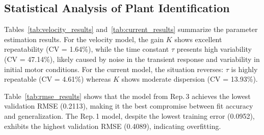 \documentclass[conference]{IEEEtran}
\begin{document}
\subsection{Statistical Analysis of Plant Identification}

Tables~\ref{tab:velocity_results} and~\ref{tab:current_results} summarize the
parameter estimation results. For the velocity model, the gain $K$ shows excellent
repeatability (CV = 1.64\%), while the time constant $\tau$ presents high variability
(CV = 47.14\%), likely caused by noise in the transient response and variability in
initial motor conditions. For the current model, the situation reverses: $\tau$ is
highly repeatable (CV = 4.61\%) whereas $K$ shows moderate dispersion (CV = 13.93\%).

\begin{table}[H]
\centering
\caption{Experimental results for velocity model identification.}
\label{tab:velocity_results}
\end{table}

\begin{table}[H]
\centering
\caption{Experimental results for current model identification.}
\label{tab:current_results}
\end{table}

Table~\ref{tab:rmse_results} shows that the model from Rep.\,3 achieves the lowest
validation RMSE (0.2113), making it the best compromise between fit accuracy and
generalization. The Rep.\,1 model, despite the lowest training error (0.0952),
exhibits the highest validation RMSE (0.4089), indicating overfitting.
\end{document}
